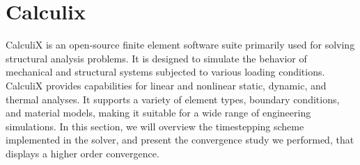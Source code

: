 \documentclass[
  english,        %
  font=times,     %
  onecolumn,      %
]{tumarticle}
\begin{document}
\section{Calculix}
CalculiX is an open-source finite element software suite primarily used for solving structural analysis problems. It is designed to simulate the behavior of mechanical and structural systems subjected to various loading conditions. CalculiX provides capabilities for linear and nonlinear static, dynamic, and thermal analyses. It supports a variety of element types, boundary conditions, and material models, making it suitable for a wide range of engineering simulations. In this section, we will overview the timestepping scheme implemented in the solver, and present the convergence study we performed, that displays a higher order convergence. 
\end{document}
